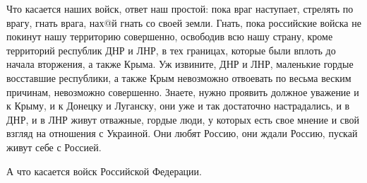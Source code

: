 Что касается наших войск, ответ наш простой: пока враг наступает, стрелять по
врагу, гнать врага, нах@й гнать со своей земли. Гнать, пока российские войска
не покинут нашу территорию совершенно, освободив всю нашу страну, кроме
территорий республик ДНР и ЛНР, в тех границах, которые были вплоть до начала
вторжения, а также Крыма. Уж извините, ДНР и ЛНР, маленькие гордые восставшие
республики, а также Крым невозможно отвоевать по весьма веским причинам,
невозможно совершенно. Знаете, нужно проявить должное уважение и к Крыму, и к
Донецку и Луганску, они уже и так достаточно настрадались, и в ДНР, и в ЛНР
живут отважные, гордые люди, у которых есть свое мнение и свой взгляд на
отношения с Украиной. Они любят Россию, они ждали Россию, пускай живут себе с
Россией.

А что касается войск Российской Федерации.
